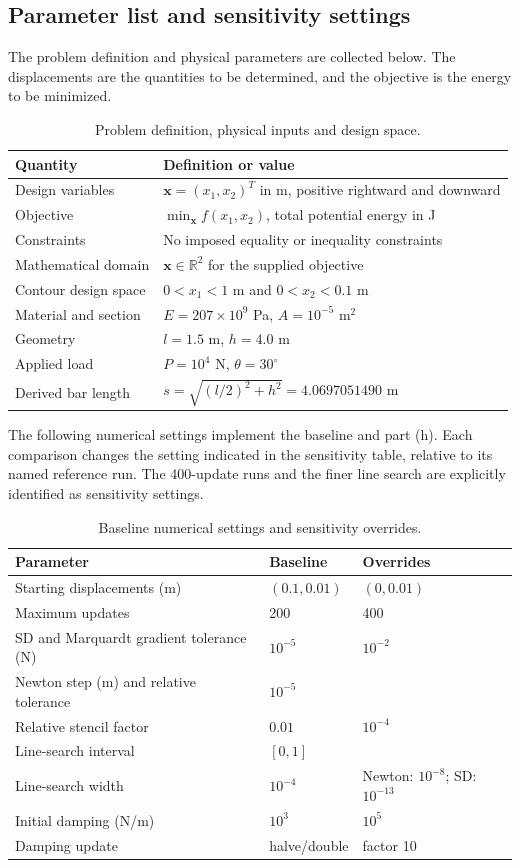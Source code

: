 \documentclass[11pt,a4paper]{article}
\begin{document}
\subsection{Parameter list and sensitivity settings}
The problem definition and physical parameters are collected below.
The displacements are the quantities to be determined, and the objective
is the energy to be minimized.
\begin{table}[H]
\centering
\caption{Problem definition, physical inputs and design space.}
\begin{tabular}{p{}p{}}
\toprule
Quantity & Definition or value\\
\midrule
Design variables & $\bm x=(x_1,x_2)^T$ in m, positive rightward and downward\\
Objective & $\min_{\bm x}f(x_1,x_2)$, total potential energy in J\\
Constraints & No imposed equality or inequality constraints\\
Mathematical domain & $\bm x\in\mathbb R^2$ for the supplied objective\\
Contour design space & $0<x_1<1$ m and $0<x_2<0.1$ m\\
Material and section & $E=207\times10^9$ Pa, $A=10^{-5}$ m$^2$\\
Geometry & $l=1.5$ m, $h=4.0$ m\\
Applied load & $P=10^4$ N, $\theta=30^\circ$\\
Derived bar length & $s=\sqrt{(l/2)^2+h^2}=4.0697051490$ m\\
\bottomrule
\end{tabular}
\end{table}
The following numerical settings implement the baseline and part (h).
Each comparison changes the setting indicated in the sensitivity table,
relative to its named reference run. The 400-update runs and the finer
line search are explicitly identified as sensitivity settings.
\begin{table}[H]
\centering
\caption{Baseline numerical settings and sensitivity overrides.}
\begin{tabular}{lll}
\toprule
Parameter & Baseline & Overrides\\
\midrule
Starting displacements (m) & $(0.1,0.01)$ & $(0,0.01)$\\
Maximum updates & 200 & 400\\
SD and Marquardt gradient tolerance (N) & $10^{-5}$ & $10^{-2}$\\
Newton step (m) and relative tolerance & $10^{-5}$ &\\
Relative stencil factor & $0.01$ & $10^{-4}$\\
Line-search interval & $[0,1]$ & \\
Line-search width & $10^{-4}$ & Newton: $10^{-8}$; SD: $10^{-13}$\\
Initial damping (N/m) & $10^3$ & $10^5$\\
Damping update & halve/double & factor 10\\
\bottomrule
\end{tabular}
\end{table}
\end{document}
